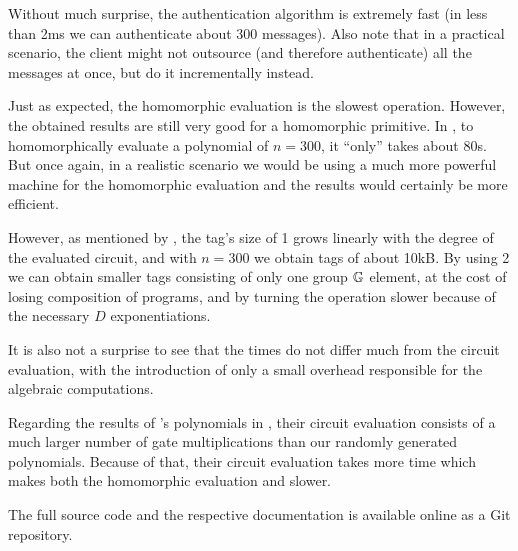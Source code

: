 



Without much surprise, the authentication algorithm \Auth is extremely fast (in
less than 2ms we can authenticate about 300 messages). Also note that in
a practical scenario, the client might not outsource (and therefore
authenticate) all the messages at once, but do it incrementally instead.

Just as expected, the homomorphic evaluation \Eval is the slowest operation.
However, the obtained results are still very good for a homomorphic primitive.
In , to homomorphically evaluate a polynomial of $n
= 300$, it ``only'' takes about 80s. But once again, in a realistic scenario we
would be using a much more powerful machine for the homomorphic evaluation and
the results would certainly be more efficient.

However, as mentioned by \citeauthor{catalano:fiore:2013}, the tag's size of
1 grows linearly with the degree of the
evaluated circuit, and with $n = 300$ we obtain tags of about 10kB.
By using 2 we can obtain smaller 
tags consisting of only one group $\mathbb{G}$ element, at the cost of losing
composition of programs, and by turning the \KeyGen operation slower because of
the necessary $D$ exponentiations.

It is also not a surprise to see that the \Vrfy times do not differ much from
the circuit evaluation, with the introduction of only a small overhead
responsible for the algebraic computations.

Regarding the results of 's
polynomials in , their circuit evaluation
consists of a much larger number of gate multiplications than our randomly
generated polynomials. Because of that, their circuit evaluation takes more
time which makes both the homomorphic evaluation \Eval and \Vrfy
slower.

The full source code and the respective documentation is available online as
a Git repository\footnotemark.
